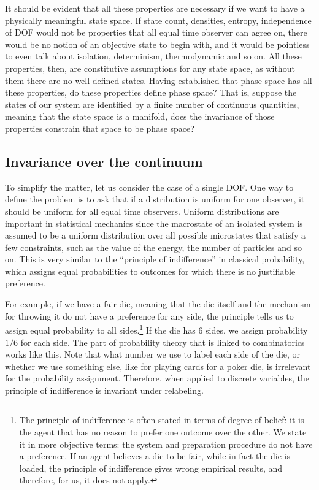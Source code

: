 It should be evident that all these properties are necessary if we want to have a physically meaningful state space. If state count, densities, entropy, independence of DOF would not be properties that all equal time observer can agree on, there would be no notion of an objective state to begin with, and it would be pointless to even talk about isolation, determinism, thermodynamic and so on. All these properties, then, are constitutive assumptions for any state space, as without them there are no well defined states. Having established that phase space has all these properties, do these properties define phase space? That is, suppose the states of our system are identified by a finite number of continuous quantities, meaning that the state space is a manifold, does the invariance of those properties constrain that space to be phase space?

\subsection{Invariance over the continuum}

To simplify the matter, let us consider the case of a single DOF. One way to define the problem is to ask that if a distribution is uniform for one observer, it should be uniform for all equal time observers. Uniform distributions are important in statistical mechanics since the macrostate of an isolated system is assumed to be a uniform distribution over all possible microstates that satisfy a few constraints, such as the value of the energy, the number of particles and so on. This is very similar to the ``principle of indifference'' in classical probability, which assigns equal probabilities to outcomes for which there is no justifiable preference.

For example, if we have a fair die, meaning that the die itself and the mechanism for throwing it do not have a preference for any side, the principle tells us to assign equal probability to all sides.\footnote{The principle of indifference is often stated in terms of degree of belief: it is the agent that has no reason to prefer one outcome over the other. We state it in more objective terms: the system and preparation procedure do not have a preference. If an agent believes a die to be fair, while in fact the die is loaded, the principle of indifference gives wrong empirical results, and therefore, for us, it does not apply.} If the die has 6 sides, we assign probability $1/6$ for each side. The part of probability theory that is linked to combinatorics works like this. Note that what number we use to label each side of the die, or whether we use something else, like for playing cards for a poker die, is irrelevant for the probability assignment. Therefore, when applied to discrete variables, the principle of indifference is invariant under relabeling.

